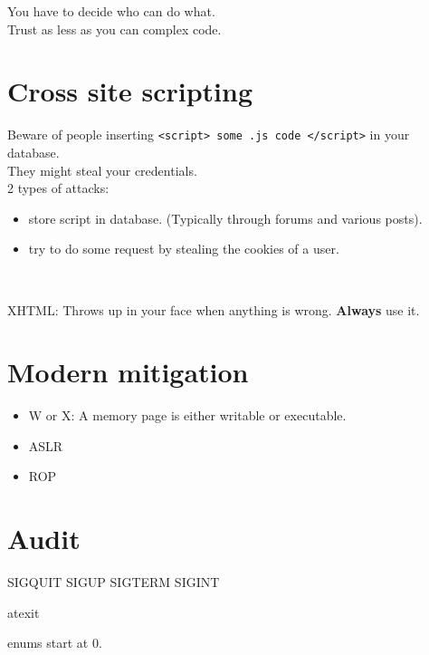 \documentclass[a4paper,11pt]{article}
\newcommand{\ls}{\begin{itemize}}
\newcommand{\li}{\item}
\newcommand{\lend}{\end{itemize}}
\begin{document}
You have to decide who can do what.\\
Trust as less as you can complex code.\\

\section{Cross site scripting}

Beware of people inserting \texttt{<script> some .js code </script>} in your database.\\
They might steal your credentials.\\

2 types of attacks:
\begin{itemize}
  \item  store script in database. (Typically through forums and various posts).
  \item  try to do some request by stealing the cookies of a user.
\end{itemize}

\

XHTML: Throws up in your face when anything is wrong. \textbf{Always} use it.

\section{Modern mitigation}

\ls
\li W or X: A memory page is either writable or executable.
\li ASLR
\li ROP
\lend

\section{Audit}

SIGQUIT SIGUP SIGTERM SIGINT

atexit

enums start at 0.
\end{document}
